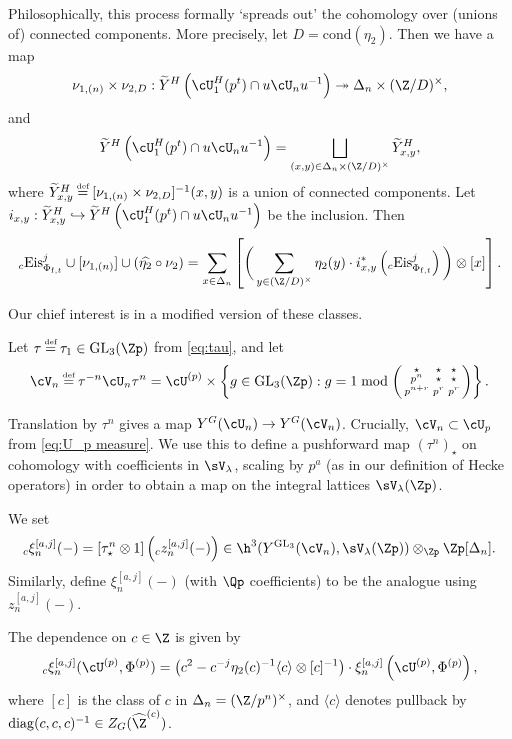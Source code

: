 \documentclass[10pt,reqno,a4paper]{amsart}
\newcommand{\subft}{_{\mathrm{f},t}}
\newcommand{\Phift}{\Phi\subft}
\newcommand{\GL}{\mathrm{GL}}
\newcommand{\Zhat}{\widehat{\Z}}
\newcommand{\smallthreemat}[9]{\left(\begin{smallmatrix}
#1 & #2 & #3 \\
#4 & #5 & #6 \\
#7 & #8 & #9\end{smallmatrix}\right)}
\begin{document}
\begin{remark}\label{rem:connected components}
Philosophically,  this process formally `spreads out' the cohomology over (unions of) connected components.  More precisely, let $D = \mathrm{cond}(\eta_2)$. Then we have a map
\[
\nu_{1,(n)} \times \nu_{2,D} : \widetilde{Y}^H\left(\cU_{1}^H(p^t) \cap u \cU_n u^{-1}\right) \twoheadrightarrow \Delta_n \times (\Z/D)^\times,
\]
and
\[
\widetilde{Y}^H\left(\cU_{1}^H(p^t) \cap u \cU_n u^{-1}\right) = \bigsqcup_{(x,y) \in \Delta_n \times (\Z/D)^\times} \widetilde{Y}^H_{x,y},
\]
where $\widetilde{Y}^H_{x,y} \defeq [\nu_{1,(n)} \times \nu_{2,D}]^{-1}(x,y)$ is a union of connected components. Let $i_{x,y} : \widetilde{Y}^H_{x,y} \hookrightarrow \widetilde{Y}^H\left(\cU_{1}^H(p^t) \cap u \cU_n u^{-1}\right)$ be the inclusion. Then
\[
{}_c \mathrm{Eis}_{\Phift}^{j} \cup [\nu_{1,(n)}] \cup (\widehat{\eta_2}\circ\nu_2)= \sum_{x \in\Delta_n} \left[\bigg(\sum_{y\in(\Z/D)^\times} \eta_2(y) \cdot i_{x,y}^*\left({}_c \mathrm{Eis}_{\Phift}^{j}\right)\bigg) \otimes [x]\right].
\]
\end{remark}

Our chief interest is in a modified version of these classes.

\begin{definition}\label{def:V_n}
Let $\tau \defeq \tau_1 \in \GL_3(\Zp)$ from \eqref{eq:tau}, and let
\[
\cV_n \defeq \tau^{-n} \cU_n \tau^n =  \cU^{(p)} \times \left\{ g \in \GL_3(\Zp) : g = 1 \bmod
\smallthreemat {\star}{\star}{\star} {p^n}{\star}{\star} {p^{n+r}}{p^r}{p^r}\right\}.
\]
\end{definition}
Translation by $\tau^n$ gives a map $Y^G(\cU_n) \to Y^G(\cV_n)$. Crucially, $\cV_n \subset \cU_p$ from \eqref{eq:U_p measure}. We use this to define a pushforward map $(\tau^n)_\star$ on cohomology with coefficients in $\sV_\lambda$, scaling by $p^a$ (as in our definition of Hecke operators) in order to obtain a map on the integral lattices $\sV_\lambda(\Zp)$.

\begin{definition}\label{def:xi aj}
We set
\[
{}_c\xi^{[a,j]}_n(-) = \left[\tau^n_\star \otimes 1\right] \left({}_c z_{n}^{[a,j]}(-)\right) \in   \h^3(Y^{\GL_3}(\cV_n), \sV_\lambda(\Zp)) \otimes_{\Zp} \Zp[\Delta_n].
\]
Similarly, define $\xi^{[a,j]}_n(-)$ (with $\Qp$ coefficients) to be the analogue using $z_{n}^{[a,j]}(-)$.
\end{definition}

The dependence on $c \in \Z$ is given by
\begin{equation}
\label{eq:c-dependence}
{}_c\xi_{n}^{[a,j]}(\cU^{(p)}, \Phi^{(p)}) = \left(c^2 - c^{-j} \eta_2(c)^{-1}  \langle c \rangle \otimes [c]^{-1}\right) \cdot \xi_{n}^{[a,j]}\left(\cU^{(p)}, \Phi^{(p)}\right),
\end{equation}
where $[c]$ is the class of $c$ in $\Delta_n = (\Z/p^n)^\times$, and $\langle c \rangle$ denotes pullback by $\operatorname{diag}(c, c, c)^{-1} \in Z_G(\Zhat^{(c)})$.
\end{document}
